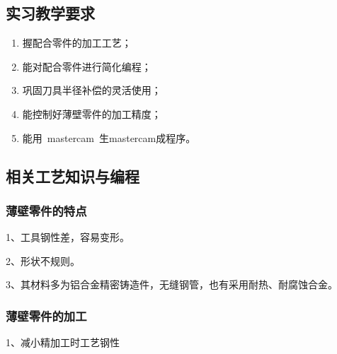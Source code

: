 \jxhj{%
	}

\makeshouye %

\subsection{实习教学要求}
\begin{enumerate}[1、]
	\item 握配合零件的加工工艺；
	\item 能对配合零件进行简化编程；
	\item 巩固刀具半径补偿的灵活使用；
    \item 能控制好薄壁零件的加工精度；
    \item 能用~mastercam~生mastercam成程序。
\end{enumerate}


\subsection{相关工艺知识与编程}

\subsubsection{薄壁零件的特点}
1、工具钢性差，容易变形。

2、形状不规则。

3、其材料多为铝合金精密铸造件，无缝钢管，也有采用耐热、耐腐蚀合金。

\subsubsection{薄壁零件的加工}
1、减小精加工时工艺钢性

